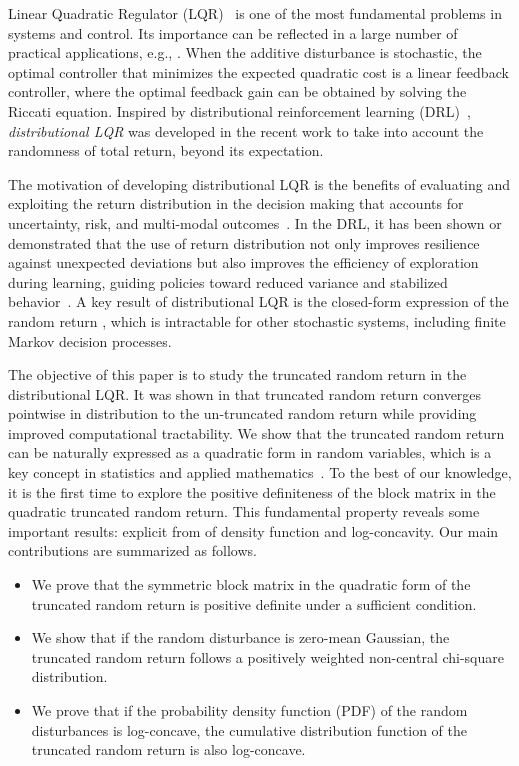 \documentclass[letterpaper, 10 pt, conference]{ieeeconf}  %
\begin{document}
{
Linear Quadratic Regulator  (LQR)~\cite{anderson2007optimal} is one of the most fundamental problems in systems and control. Its importance can be reflected in a large number of practical applications,  e.g., \cite{vandamme2023model,todorov2002optimal}. When the additive disturbance is stochastic, the optimal controller that minimizes the expected quadratic cost is a linear feedback controller, where the optimal feedback gain can be obtained by solving the Riccati  equation.  Inspired by distributional reinforcement learning (DRL)~\cite{bellemare2017distributional}, \emph{distributional LQR} was developed  in  the recent work \cite{wang2023policy,wang2023policyL4dc} to take into account the randomness of total return, beyond its expectation.  


The motivation of developing distributional LQR is the benefits of evaluating and exploiting the return distribution in the decision making that  accounts for uncertainty, risk, and multi-modal outcomes~\cite{chow2018risk,wang2023policyL4dc}. 
 In the DRL, it has been shown or demonstrated that the use of return distribution not only improves resilience against unexpected deviations but also improves the efficiency of exploration during learning, guiding policies toward reduced variance and stabilized behavior~\cite{dabney2018distributional}.   
A key result of distributional LQR is the closed-form expression of the random return \cite{wang2023policy,wang2023policyL4dc}, which is intractable for other stochastic systems, including finite Markov decision processes. 
 

The  objective of this paper
is to  study the truncated random return in the distributional LQR.  It was shown in \cite{wang2023policy,wang2023policyL4dc} that truncated random return converges pointwise in distribution to the un-truncated random return while providing improved computational tractability. We show that the truncated random return can be naturally expressed as a quadratic form in random variables, which is a key concept in statistics and applied mathematics~\cite{Mathai1992, varberg1966convergence}. 
To the best of our knowledge, it is the first time to explore the positive definiteness of the block matrix in the quadratic truncated random return. This fundamental property reveals some important results: explicit from of density function and log-concavity.   
Our main contributions are summarized as follows. 
\begin{itemize}
    \item[(1)] We prove that the  symmetric block matrix in the quadratic form of the truncated random return is positive definite under a sufficient condition. 
    \item[(2)] We show that if the random disturbance is zero-mean Gaussian, the truncated random return follows a positively weighted non-central chi-square distribution. 
    \item[(3)] We prove that if the probability density function (PDF) of the random disturbances is log-concave, the cumulative distribution function of the truncated random return is also log-concave. 
\end{itemize}}
\end{document}
